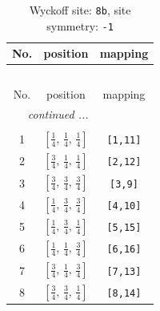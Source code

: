 \documentclass[fleqn,8pt]{jsarticle}
\begin{document}
\begin{longtable}{ccc}
\caption{Wyckoff site: {\tt 8b}, site symmetry: {\tt -1}}
 \\
 \hline \hline
No. & position & mapping \\ \hline \endfirsthead

\multicolumn{2}{l}{\tablename\ \thetable{}} \\
 \hline \hline
No. & position & mapping \\ \hline \endhead

 \hline \hline
\multicolumn{2}{r}{\footnotesize\it continued ...} \\ \endfoot

 \hline \hline
\multicolumn{2}{r}{} \\ \endlastfoot

1 & $\left[ \frac{1}{4},\, \frac{1}{4},\, \frac{1}{4} \right]$ & {\tt [1,11]} \\ \hline
2 & $\left[ \frac{3}{4},\, \frac{1}{4},\, \frac{1}{4} \right]$ & {\tt [2,12]} \\ \hline
3 & $\left[ \frac{3}{4},\, \frac{3}{4},\, \frac{3}{4} \right]$ & {\tt [3,9]} \\ \hline
4 & $\left[ \frac{1}{4},\, \frac{3}{4},\, \frac{3}{4} \right]$ & {\tt [4,10]} \\ \hline
5 & $\left[ \frac{1}{4},\, \frac{3}{4},\, \frac{1}{4} \right]$ & {\tt [5,15]} \\ \hline
6 & $\left[ \frac{1}{4},\, \frac{1}{4},\, \frac{3}{4} \right]$ & {\tt [6,16]} \\ \hline
7 & $\left[ \frac{3}{4},\, \frac{1}{4},\, \frac{3}{4} \right]$ & {\tt [7,13]} \\ \hline
8 & $\left[ \frac{3}{4},\, \frac{3}{4},\, \frac{1}{4} \right]$ & {\tt [8,14]} \\
\end{longtable}
\renewcommand{\arraystretch}{1.2}
\end{document}
